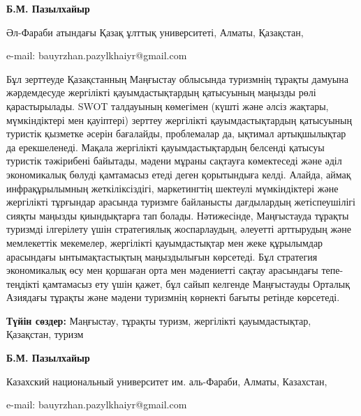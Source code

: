 \begin{center}
{\bfseries Б.М. Пазылхайыр}

Әл-Фараби атындағы Қазақ ұлттық университеті, Алматы, Қазақстан,

e-mail: bauyrzhan.pazylkhaiyr@gmail.com
\end{center}

Бұл зерттеуде Қазақстанның Маңғыстау облысында туризмнің тұрақты дамуына
жәрдемдесуде жергілікті қауымдастықтардың қатысуының маңызды рөлі
қарастырылады. SWOT талдауының көмегімен (күшті және әлсіз жақтары,
мүмкіндіктері мен қауіптері) зерттеу жергілікті қауымдастықтардың
қатысуының туристік қызметке әсерін бағалайды, проблемалар да, ықтимал
артықшылықтар да ерекшеленеді. Мақала жергілікті қауымдастықтардың
белсенді қатысуы туристік тәжірибені байытады, мәдени мұраны сақтауға
көмектеседі және әділ экономикалық бөлуді қамтамасыз етеді деген
қорытындыға келді. Алайда, аймақ инфрақұрылымның жеткіліксіздігі,
маркетингтің шектеулі мүмкіндіктері және жергілікті тұрғындар арасында
туризмге байланысты дағдылардың жетіспеушілігі сияқты маңызды
қиындықтарға тап болады. Нәтижесінде, Маңғыстауда тұрақты туризмді
ілгерілету үшін стратегиялық жоспарлаудың, әлеуетті арттырудың және
мемлекеттік мекемелер, жергілікті қауымдастықтар мен жеке құрылымдар
арасындағы ынтымақтастықтың маңыздылығын көрсетеді. Бұл стратегия
экономикалық өсу мен қоршаған орта мен мәдениетті сақтау арасындағы
тепе-теңдікті қамтамасыз ету үшін қажет, бұл сайып келгенде Маңғыстауды
Орталық Азиядағы тұрақты және мәдени туризмнің көрнекті бағыты ретінде
көрсетеді.

{\bfseries Түйін сөздер:} Маңғыстау, тұрақты туризм, жергілікті
қауымдастықтар, Қазақстан, туризм


\begin{center}
{\bfseries Б.М. Пазылхайыр}

Казахский национальный университет им. аль-Фараби, Алматы, Казахстан,

e-mail: bauyrzhan.pazylkhaiyr@gmail.com
\end{center}

